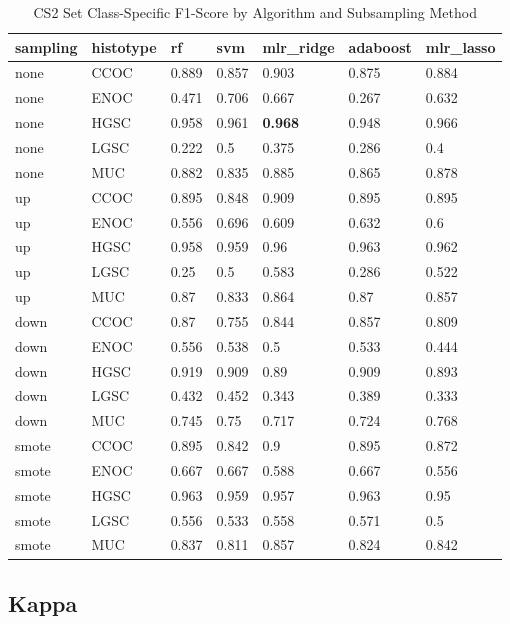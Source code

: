 \documentclass[
]{report}
\begin{document}
\begin{table}

\caption{\label{tab:cs2-f1-class-table}CS2 Set Class-Specific F1-Score by Algorithm and Subsampling Method}
\centering
\begin{tabular}[t]{l|l|l|l|l|l|l}
\hline
sampling & histotype & rf & svm & mlr\_ridge & adaboost & mlr\_lasso\\
\hline
none & CCOC & 0.889 & 0.857 & 0.903 & 0.875 & 0.884\\
\hline
none & ENOC & 0.471 & 0.706 & 0.667 & 0.267 & 0.632\\
\hline
none & HGSC & 0.958 & 0.961 & \textbf{0.968} & 0.948 & 0.966\\
\hline
none & LGSC & 0.222 & 0.5 & 0.375 & 0.286 & 0.4\\
\hline
none & MUC & 0.882 & 0.835 & 0.885 & 0.865 & 0.878\\
\hline
up & CCOC & 0.895 & 0.848 & 0.909 & 0.895 & 0.895\\
\hline
up & ENOC & 0.556 & 0.696 & 0.609 & 0.632 & 0.6\\
\hline
up & HGSC & 0.958 & 0.959 & 0.96 & 0.963 & 0.962\\
\hline
up & LGSC & 0.25 & 0.5 & 0.583 & 0.286 & 0.522\\
\hline
up & MUC & 0.87 & 0.833 & 0.864 & 0.87 & 0.857\\
\hline
down & CCOC & 0.87 & 0.755 & 0.844 & 0.857 & 0.809\\
\hline
down & ENOC & 0.556 & 0.538 & 0.5 & 0.533 & 0.444\\
\hline
down & HGSC & 0.919 & 0.909 & 0.89 & 0.909 & 0.893\\
\hline
down & LGSC & 0.432 & 0.452 & 0.343 & 0.389 & 0.333\\
\hline
down & MUC & 0.745 & 0.75 & 0.717 & 0.724 & 0.768\\
\hline
smote & CCOC & 0.895 & 0.842 & 0.9 & 0.895 & 0.872\\
\hline
smote & ENOC & 0.667 & 0.667 & 0.588 & 0.667 & 0.556\\
\hline
smote & HGSC & 0.963 & 0.959 & 0.957 & 0.963 & 0.95\\
\hline
smote & LGSC & 0.556 & 0.533 & 0.558 & 0.571 & 0.5\\
\hline
smote & MUC & 0.837 & 0.811 & 0.857 & 0.824 & 0.842\\
\hline
\end{tabular}
\end{table}

\hypertarget{kappa-3}{%
\subsection{Kappa}\label{kappa-3}}
\end{document}
